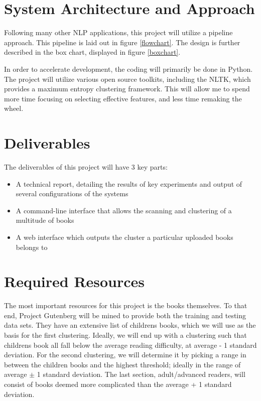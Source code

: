 \documentclass[]{article}
\begin{document}
\section{System Architecture and Approach}

Following many other NLP applications, this project will utilize a pipeline approach.
This pipeline is laid out in figure \ref{flowchart}.
The design is further described in the box chart, displayed in figure \ref{boxchart}.

In order to accelerate development, the coding will primarily be done in Python.
The project will utilize various open source toolkits, including the NLTK, which provides a maximum entropy clustering framework.
This will allow me to spend more time focusing on selecting effective features, and less time remaking the wheel.

\section{Deliverables}

The deliverables of this project will have 3 key parts:
\begin{itemize}
	\item A technical report, detailing the results of key experiments and output of several configurations of the systems
	\item A command-line interface that allows the scanning and clustering of a multitude of books
	\item A web interface which outputs the cluster a particular uploaded books belongs to
\end{itemize}

\section{Required Resources}

The most important resources for this project is the books themselves.
To that end, Project Gutenberg will be mined to provide both the training and testing data sets.
They have an extensive list of childrens books, which we will use as the basis for the first clustering.
Ideally, we will end up with a clustering such that childrens book all fall below the average reading difficulty, at average - 1 standard deviation.
For the second clustering, we will determine it by picking a range in between the children books and the highest threshold; ideally in the range of average $\pm$ 1 standard deviation.
The last section, adult/advanced readers, will consist of books deemed more complicated than the average + 1 standard deviation.
\end{document}
